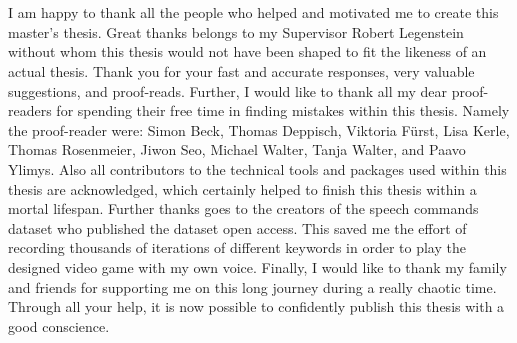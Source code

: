 
\chapter*{}
I am happy to thank all the people who helped and motivated me to create this master's thesis.
Great thanks belongs to my Supervisor Robert Legenstein without whom this thesis would not have been shaped to fit the likeness of an actual thesis.
Thank you for your fast and accurate responses, very valuable suggestions, and proof-reads.
Further, I would like to thank all my dear proof-readers for spending their free time in finding mistakes within this thesis.
Namely the proof-reader were: Simon Beck, Thomas Deppisch, Viktoria Fürst, Lisa Kerle, Thomas Rosenmeier, Jiwon Seo, Michael Walter, Tanja Walter, and Paavo Ylimys.
Also all contributors to the technical tools and packages used within this thesis are acknowledged, which certainly helped to finish this thesis within a mortal lifespan.
Further thanks goes to the creators of the speech commands dataset who published the dataset open access.
This saved me the effort of recording thousands of iterations of different keywords in order to play the designed video game with my own voice.
Finally, I would like to thank my family and friends for supporting me on this long journey during a really chaotic time.
Through all your help, it is now possible to confidently publish this thesis with a good conscience.